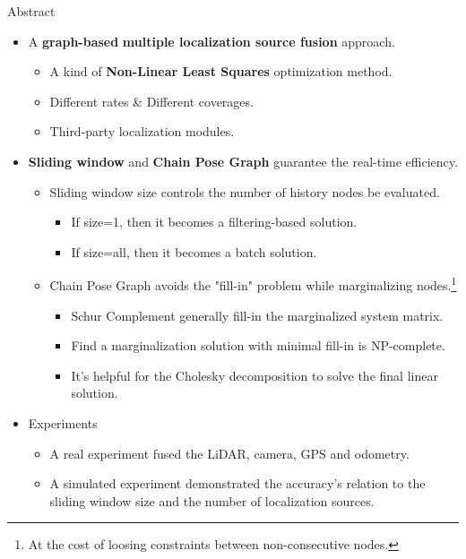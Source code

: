 \documentclass[10pt]{beamer}
\begin{document}
	\begin{frame}{Abstract}
		\begin{itemize}
			\item<1-> A \textbf{graph-based} \textbf{multiple localization source fusion} approach.
			\begin{itemize}
				\item A kind of \textbf{Non-Linear Least Squares} optimization method.
				\item Different rates \& Different coverages.
				\item Third-party localization modules.
			\end{itemize}
			\item<2-> \textbf{Sliding window} and \textbf{Chain Pose Graph} guarantee the real-time efficiency.
			\begin{itemize}
				\item Sliding window size controls the number of history nodes be evaluated.
				\begin{itemize}
					\item If size=1, then it becomes a filtering-based solution.
					\item If size=all, then it becomes a batch solution.
				\end{itemize}
				\item Chain Pose Graph avoids the "fill-in" problem while marginalizing nodes.\footnote{At the cost of loosing constraints between non-consecutive nodes.}
				\begin{itemize}
					\item Schur Complement generally fill-in the marginalized system matrix.
					\item Find a marginalization solution with minimal fill-in is NP-complete.
					\item It's helpful for the Cholesky decomposition to solve the final linear solution.
				\end{itemize}
			\end{itemize}
			\item<3-> Experiments
			\begin{itemize}
				\item A real experiment fused the LiDAR, camera, GPS and odometry.
				\item A simulated experiment demonstrated the accuracy's relation to the sliding window size and the number of localization sources.
			\end{itemize}
		\end{itemize}
	\end{frame}
\end{document}

